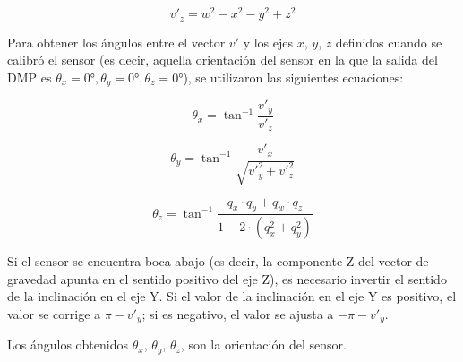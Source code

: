 \begin{equation}
	v'_z = w^2 - x^2 - y^2 + z^2
	\label{eq:componentez}
\end{equation}

Para obtener los ángulos entre el vector $v'$ y los ejes $x$, $y$, $z$ definidos cuando se calibró el sensor (es decir, aquella orientación del sensor en la que la salida del DMP es $\theta_x = 0°,\theta_y = 0°,\theta_z = 0°$), se utilizaron las siguientes ecuaciones:

\begin{equation}
	\theta_x = \tan^{-1}\frac{v'_y}{v'_z}
	\label{eq:angulox}
\end{equation}

\begin{equation}
	\theta_y = \tan^{-1}\frac{v'_x}{\sqrt{v'^2_y + v'^2_z}}
	\label{eq:anguloy}
\end{equation}

\begin{equation}
	\theta_z = \tan^{-1}\frac{q_x \cdot q_y + q_w \cdot q_z}{1 - 2 \cdot (q_x^2 + q_y^2)}
	\label{eq:anguloz}
\end{equation}

Si el sensor se encuentra boca abajo (es decir, la componente Z del vector de gravedad apunta en el sentido positivo del eje Z), es necesario invertir el sentido de la inclinación en el eje Y. Si el valor de la inclinación en el eje Y es positivo, el valor se corrige a $\pi - v'_y$; si es negativo, el valor se ajusta a $-\pi - v'_y$.

Los ángulos obtenidos $\theta_x$, $\theta_y$, $\theta_z$, son la orientación del sensor.